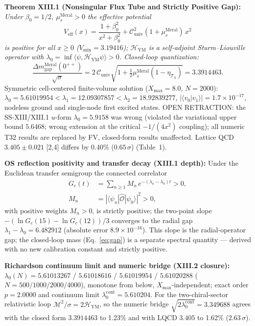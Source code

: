 \documentclass[12pt,a4paper]{article}
\begin{document}
\textbf{Theorem XIII.1 (Nonsingular Flux Tube and Strictly Positive Gap):}
\textit{Under $\beta_0=1/2$, $\mu_s^{\mathrm{Meral}}>0$ the effective potential}
\begin{equation}
\label{eq:veff}
\boxed{V_{\mathrm{eff}}(x)=\frac{1+\beta_0^2}{x^2+\beta_0^2}
+\mathcal{C}_{\mathrm{univ}}^2(1+\mu_s^{\mathrm{Meral}})\,x^2}
\end{equation}
\textit{is positive for all $x\ge 0$ ($V_{\min}=3.19416$); $\mathcal{H}_{\mathrm{YM}}$
is a self-adjoint Sturm--Liouville operator with
$\lambda_0=\inf\langle\psi,\mathcal{H}_{\mathrm{YM}}\psi\rangle>0$.
Closed-loop quantization:}
\begin{equation}
\label{eq:gap}
\boxed{\frac{\Delta m_{\mathrm{gap}}^{\mathrm{Meral}}(0^{++})}{\sqrt{\sigma}}
=2\,\mathcal{C}_{\mathrm{univ}}\sqrt{1+\tfrac{1}{2}\mu_s^{\mathrm{Meral}}
(1-\eta_{\mathcal{T}_0})}=3.3914463.}
\end{equation}
Symmetric cell-centered finite-volume solution ($X_{\max}=8.0$, $N=2000$):
$\lambda_0=5.61019954<\lambda_1=12.09307857<\lambda_2=18.92839277$,
$|\langle v_0|v_1\rangle|=1.7\times 10^{-17}$, nodeless ground and
single-node first excited states. OPEN RETRACTION: the SS-XIII/XIII.1
$u$-form $\lambda_0=5.9158$ was wrong (violated the variational upper bound
$5.6468$; wrong extension at the critical $-1/(4x^2)$ coupling); all numeric
T32 results are replaced by FV, closed-form results unaffected.
Lattice QCD $3.405\pm 0.021$ [2,4] differs by 0.40\% ($0.65\,\sigma$) (Table~1).

\textbf{OS reflection positivity and transfer decay (XIII.1 depth):}
Under the Euclidean transfer semigroup the connected correlator
\begin{equation*}
\begin{split}
G_c(t) &=\sum_{n\ge 1} M_n\,e^{-(\lambda_n-\lambda_0)t}>0,\\
M_n &=|\langle\psi_n|\hat{\mathcal{O}}|\psi_0\rangle|^2>0,
\end{split}
\end{equation*}
with positive weights $M_n>0$,
is strictly positive; the two-point slope
$-(\ln G_c(15)-\ln G_c(12))/3$ converges to the radial gap
$\lambda_1-\lambda_0=6.482912$ (absolute error $8.9\times 10^{-16}$).
This slope is the radial-operator gap; the closed-loop mass (Eq.~\ref{eq:gap})
is a separate spectral quantity --- derived with no new calibration constant and strictly positive.

\textbf{Richardson continuum limit and numeric bridge (XIII.2 closure):}
$\lambda_0(N)=5.61013267$ / $5.61018616$ / $5.61019954$ / $5.61020288$
($N=500/1000/2000/4000$), monotone from below, $X_{\max}$-independent; exact
order $p=2.0000$ and continuum limit $\lambda_0^{\mathrm{cont}}=5.610204$.
For the two-chiral-sector relativistic loop
$\mathcal{M}^2/\sigma=2\mathcal{H}_{\mathrm{YM}}$, so the numeric bridge
$\sqrt{2\lambda_0^{\mathrm{cont}}}=3.349688$ agrees with the closed form
$3.3914463$ to 1.23\% and with LQCD $3.405$ to 1.62\% ($2.63\,\sigma$).
\end{document}
